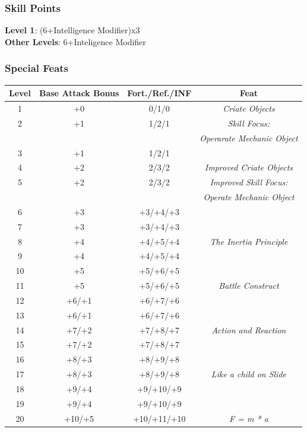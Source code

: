 \documentclass[ letterpaper,12pt]{article}
\begin{document}
\subsubsection{Skill Points}
{\bf Level 1}: (6+Intelligence Modifier)x3\\
{\bf Other Levels}: 6+Inteligence Modifier\\

\subsubsection{Special Feats}
\begin{center} \begin{tabular}{|c||c|c|c|}
\hline
{\bf Level}&{\bf Base Attack Bonus}&{\bf Fort./Ref./INF}&{\bf Feat}\\
\hline
1&+0&0/1/0&{\it Criate Objects }\\
\hline
2&+1&1/2/1&{\it Skill Focus:}\\
 & & & {\it Operarate Mechanic Object}\\
\hline
3&+1&1/2/1&\\
\hline
4&+2&2/3/2&{\it Improved Criate Objects}\\
\hline
5&+2&2/3/2&{\it Improved Skill Focus:}\\
&&&{\it Operate Mechanic Object}\\
\hline
6&+3&+3/+4/+3&\\
\hline
7&+3&+3/+4/+3&\\
\hline
8&+4&+4/+5/+4&{\it The Inertia Principle}\\
\hline
9&+4&+4/+5/+4&\\
\hline
10&+5&+5/+6/+5&\\
\hline
11&+5&+5/+6/+5&{\it Battle Construct}\\
\hline
12&+6/+1&+6/+7/+6&\\
\hline
13&+6/+1&+6/+7/+6&\\
\hline
14&+7/+2&+7/+8/+7&{\it Action and Reaction}\\
\hline
15&+7/+2&+7/+8/+7&\\
\hline
16&+8/+3&+8/+9/+8&\\
\hline
17&+8/+3&+8/+9/+8&{\it Like a child on Slide}\\
\hline
18&+9/+4&+9/+10/+9&\\
\hline
19&+9/+4&+9/+10/+9&\\
\hline
20&+10/+5&+10/+11/+10&{\it F = m * a}\\
\hline
\end{tabular} \end{center}
\end{document}
